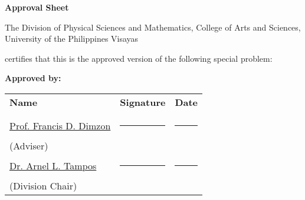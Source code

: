 \thispagestyle{empty}
\begin{center}
	\textbf{Approval Sheet}
	
	The Division of Physical Sciences and Mathematics, College of Arts and Sciences, University of the Philippines Visayas 
	
	certifies that this is the approved version of the following special problem:
	
\end{center}

{\small\textbf{Approved by:}}

\newcommand{\signaturerule}{\rule{10em}{.4pt}}
\begin{tabular}{lll}
	\bfseries Name  & \bfseries Signature & \bfseries Date\\ \\
	\underline{Prof. Francis D. Dimzon} &\signaturerule  & \signaturerule\\ 
	(Adviser)\\
	\underline{Dr. Arnel L. Tampos}  &\signaturerule &\signaturerule\\
	(Division Chair)
	
\end{tabular}